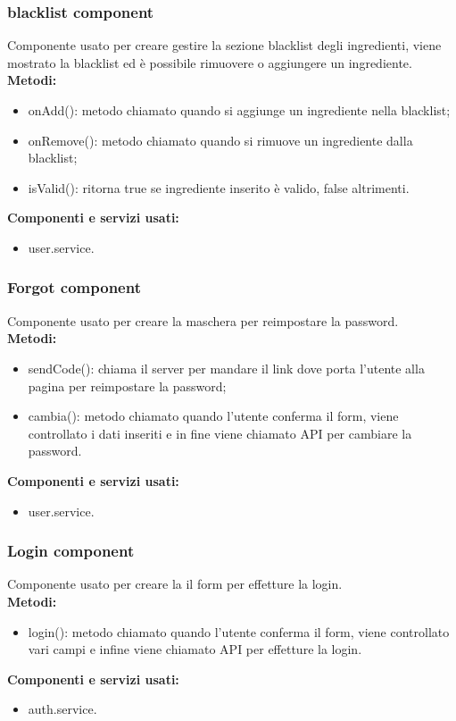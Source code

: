 \subsubsection{blacklist component}
Componente usato per creare gestire la sezione blacklist degli ingredienti, viene mostrato la blacklist ed è possibile rimuovere o aggiungere un ingrediente.\\
\textbf{Metodi:}
\begin{itemize}
    \item onAdd(): metodo chiamato quando si aggiunge un ingrediente nella blacklist;
    \item onRemove(): metodo chiamato quando si rimuove un ingrediente dalla blacklist;
    \item isValid(): ritorna true se ingrediente inserito è valido, false altrimenti.
\end{itemize}
\textbf{Componenti e servizi usati:}
\begin{itemize}
    \item user.service.
\end{itemize}

\subsubsection{Forgot component}
Componente usato per creare la maschera per reimpostare la password.\\
\textbf{Metodi:}
\begin{itemize}
    \item sendCode(): chiama il server per mandare il link dove porta l'utente alla pagina per reimpostare la password;
    \item cambia(): metodo chiamato quando l'utente conferma il form, viene controllato i dati inseriti e in fine viene chiamato API per cambiare la password.
\end{itemize}
\textbf{Componenti e servizi usati:}
\begin{itemize}
    \item user.service.
\end{itemize}

\subsubsection{Login component}
Componente usato per creare la il form per effetture la login.\\
\textbf{Metodi:}
\begin{itemize}
    \item login(): metodo chiamato quando l'utente conferma il form, viene controllato vari campi e infine viene chiamato API per effetture la login.
\end{itemize}
\textbf{Componenti e servizi usati:}
\begin{itemize}
    \item auth.service.
\end{itemize}

